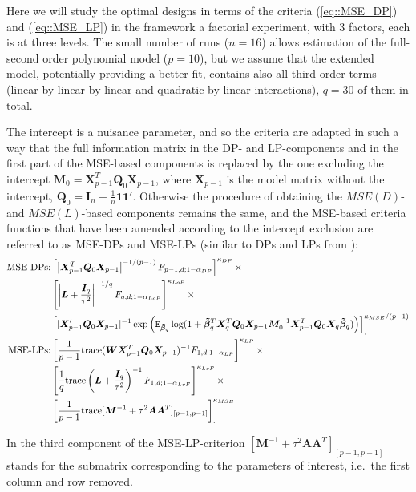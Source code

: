 
Here we will study the optimal designs in terms of the criteria (\ref{eq::MSE_DP}) and (\ref{eq::MSE_LP})  in the framework a factorial experiment, with $3$ factors, each is at three levels. The small number of runs ($n=16$) allows estimation of the full-second order polynomial model ($p=10$), but we assume that the extended model, potentially providing a better fit,  contains also all third-order terms (linear-by-linear-by-linear and quadratic-by-linear interactions), $q=30$ of them in total. 

The intercept is a nuisance parameter, and so the criteria are adapted in such a way that the full information matrix in the DP- and LP-components and in the first part of the MSE-based components is replaced by the one excluding the intercept $\bm{M}_0 = \bm{X}^T_{p-1}\bm{Q}_0\bm{X}_{p-1}$, where $\bm{X}_{p-1}$ is the model matrix without the intercept, $\bm{Q}_0=\bm{I}_n-\frac{1}{n}\bm{11}'$. Otherwise the procedure of obtaining the $MSE(D)$- and $MSE(L)$-based components remains the same, and the MSE-based criteria functions that have been amended according to the intercept exclusion are referred to as MSE-DPs and MSE-LPs (similar to DPs and LPs from \cite{GilmourTrinca2012}):
\begin{align*}
\mbox{MSE-DPs:} &\left[\left|\bm{X}^T_{p-1}\bm{Q}_0\bm{X}_{p-1}\right|^{-1/(p-1)}F_{p-1,d;1-\alpha_{DP}}\right]^{\kappa_{DP}} \times \notag \\ &\left[\left|\bm{L}+\frac{\bm{I}_{q}}{\tau^{2}}\right|^{-1/q}F_{q,d;1-\alpha_{LoF}}\right]^{\kappa_{LoF}}\times \notag\\ & \left[|\bm{X}'_{p-1}\bm{Q}_0\bm{X}_{p-1}|^{-1}\exp\left(\mathtt{E}_{\bm{\tilde{\beta}}_q}\log(1+\bm{\tilde{\beta}}_q^T\bm{X}_q^{T}\bm{Q}_0\bm{X}_{p-1}\bm{M}_0^{-1}\bm{X}_{p-1}^{T}\bm{Q}_0\bm{X}_q\bm{\tilde{\beta}}_q) \right)\right]_{,}^{\kappa_{MSE}/(p-1)}\\
\mbox{MSE-LPs:} &\left[\frac{1}{p-1}\mbox{trace}(\bm{WX}^T_{p-1}\bm{Q}_{0}\bm{X}_{p-1})^{-1}F_{1,d;1-\alpha_{LP}}\right]^{\kappa_{LP}}\times \notag\\& \left[\frac{1}{q}\mbox{trace}\left(\bm{L}+\frac{\bm{I}_{q}}{\tau^{2}}\right)^{-1}F_{1,d;1-\alpha_{LoF}}\right]^{\kappa_{LoF}}\times 
\notag\\& \left[\frac{1}{p-1}\mbox{trace}[\bm{M}^{-1}+\tau^2\bm{A}\bm{A}^T]_{[p-1, p-1]}\right]_{.}^{\kappa_{MSE}}
\end{align*}

In the third component of the MSE-LP-criterion $[\bm{M}^{-1}+\tau^2\bm{A}\bm{A}^T]_{[p-1, p-1]}$ stands for the submatrix corresponding to the parameters of interest, i.e.~the first column and  row removed.

